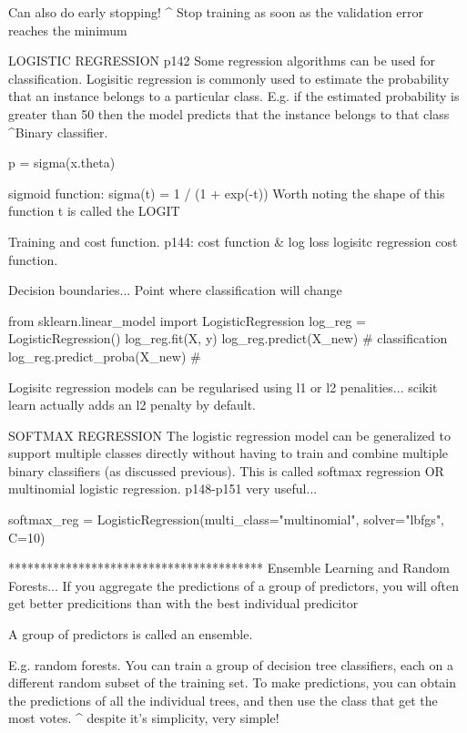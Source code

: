 Can also do early stopping!
^ Stop training as soon as the validation error reaches the minimum

LOGISTIC REGRESSION p142
Some regression algorithms can be used for classification.
Logisitic regression is commonly used to estimate the probability that
an instance belongs to a particular class.
E.g. if the estimated probability is greater than 50%
then the model predicts that the instance belongs to that class
^Binary classifier.

p = sigma(x.theta)

sigmoid function:
sigma(t) = 1 / (1 + exp(-t))
Worth noting the shape of this function
t is called the LOGIT

Training and cost function.
p144: cost function & log loss logisitc regression cost function.

Decision boundaries...
Point where classification will change

from sklearn.linear_model import LogisticRegression
log_reg = LogisticRegression()
log_reg.fit(X, y)
log_reg.predict(X_new) # classification
log_reg.predict_proba(X_new) # 

Logisitc regression models can be regularised using l1 or l2 penalities...
scikit learn actually adds an l2 penalty by default.

SOFTMAX REGRESSION
The logistic regression model can be generalized to support multiple classes directly
without having to train and combine multiple binary classifiers (as discussed previous).
This is called softmax regression OR multinomial logistic regression.
p148-p151 very useful...

softmax_reg = LogisticRegression(multi_class="multinomial", solver="lbfgs", C=10)












****************************************
Ensemble Learning and Random Forests...
If you aggregate the predictions of a group of predictors,
you will often get better predicitions than with the best individual predicitor

A group of predictors is called an ensemble.

E.g. random forests.
You can train a group of decision tree classifiers,
each on a different random subset of the training set.
To make predictions, you can obtain the predictions of all the individual trees,
and then use the class that get the most votes.
^ despite it's simplicity, very simple!

